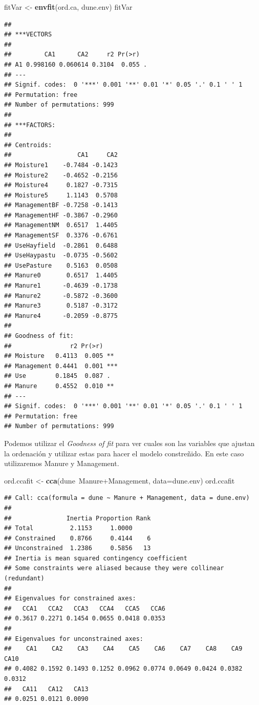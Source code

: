 \documentclass[]{book}
\newenvironment{Shaded}{\begin{snugshade}}{\end{snugshade}}
\newcommand{\KeywordTok}[1]{\textcolor[rgb]{0.13,0.29,0.53}{\textbf{{#1}}}}
\newcommand{\DataTypeTok}[1]{\textcolor[rgb]{0.13,0.29,0.53}{{#1}}}
\newcommand{\StringTok}[1]{\textcolor[rgb]{0.31,0.60,0.02}{{#1}}}
\newcommand{\NormalTok}[1]{{#1}}
\begin{document}
\begin{Shaded}
\begin{Highlighting}[]
\NormalTok{fitVar <-}\StringTok{ }\KeywordTok{envfit}\NormalTok{(ord.ca, dune.env)}
\NormalTok{fitVar}
\end{Highlighting}
\end{Shaded}

\begin{verbatim}
## 
## ***VECTORS
## 
##         CA1      CA2     r2 Pr(>r)  
## A1 0.998160 0.060614 0.3104  0.055 .
## ---
## Signif. codes:  0 '***' 0.001 '**' 0.01 '*' 0.05 '.' 0.1 ' ' 1
## Permutation: free
## Number of permutations: 999
## 
## ***FACTORS:
## 
## Centroids:
##                  CA1     CA2
## Moisture1    -0.7484 -0.1423
## Moisture2    -0.4652 -0.2156
## Moisture4     0.1827 -0.7315
## Moisture5     1.1143  0.5708
## ManagementBF -0.7258 -0.1413
## ManagementHF -0.3867 -0.2960
## ManagementNM  0.6517  1.4405
## ManagementSF  0.3376 -0.6761
## UseHayfield  -0.2861  0.6488
## UseHaypastu  -0.0735 -0.5602
## UsePasture    0.5163  0.0508
## Manure0       0.6517  1.4405
## Manure1      -0.4639 -0.1738
## Manure2      -0.5872 -0.3600
## Manure3       0.5187 -0.3172
## Manure4      -0.2059 -0.8775
## 
## Goodness of fit:
##                r2 Pr(>r)    
## Moisture   0.4113  0.005 ** 
## Management 0.4441  0.001 ***
## Use        0.1845  0.087 .  
## Manure     0.4552  0.010 ** 
## ---
## Signif. codes:  0 '***' 0.001 '**' 0.01 '*' 0.05 '.' 0.1 ' ' 1
## Permutation: free
## Number of permutations: 999
\end{verbatim}

Podemos utilizar el \emph{Goodness of fit} para ver cuales son las
variables que ajustan la ordenación y utilizar estas para hacer el
modelo constreñido. En este caso utilizaremos Manure y Management.

\begin{Shaded}
\begin{Highlighting}[]
\NormalTok{ord.ccafit <-}\StringTok{ }\KeywordTok{cca}\NormalTok{(dune~Manure+Management, }\DataTypeTok{data=}\NormalTok{dune.env)}
\NormalTok{ord.ccafit}
\end{Highlighting}
\end{Shaded}

\begin{verbatim}
## Call: cca(formula = dune ~ Manure + Management, data = dune.env)
## 
##               Inertia Proportion Rank
## Total          2.1153     1.0000     
## Constrained    0.8766     0.4144    6
## Unconstrained  1.2386     0.5856   13
## Inertia is mean squared contingency coefficient 
## Some constraints were aliased because they were collinear (redundant)
## 
## Eigenvalues for constrained axes:
##   CCA1   CCA2   CCA3   CCA4   CCA5   CCA6 
## 0.3617 0.2271 0.1454 0.0655 0.0418 0.0353 
## 
## Eigenvalues for unconstrained axes:
##    CA1    CA2    CA3    CA4    CA5    CA6    CA7    CA8    CA9   CA10 
## 0.4082 0.1592 0.1493 0.1252 0.0962 0.0774 0.0649 0.0424 0.0382 0.0312 
##   CA11   CA12   CA13 
## 0.0251 0.0121 0.0090
\end{verbatim}
\end{document}
